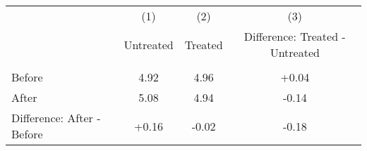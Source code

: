 \begin{tabular}{lccc} \hline
 & (1) & (2) & (3) \\
 & Untreated & Treated & Difference: Treated - Untreated \\ \hline
 &  &  &  \\
Before & 4.92 & 4.96 & +0.04 \\
After & 5.08 & 4.94 & -0.14 \\ \hline
Difference: After - Before & +0.16 & -0.02 & -0.18 \\ \hline
\end{tabular}
